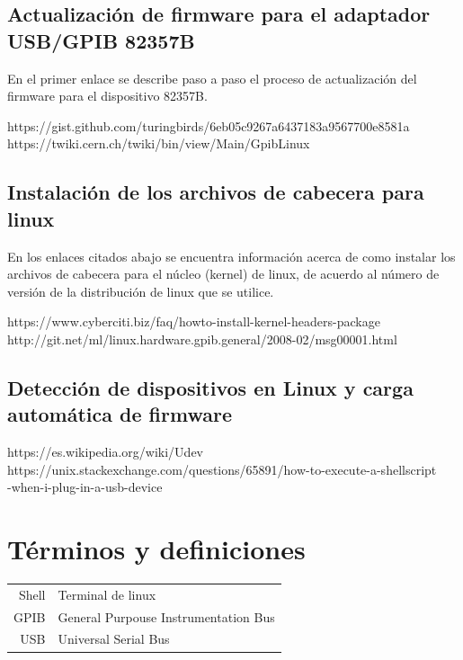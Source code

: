 \documentclass[paper=letter,oneside,fontsize=11pt, parskip=full]{scrartcl}
\newenvironment{link}
	{\ttfamily}{}
\begin{document}
	\subsection{Actualización de firmware para el adaptador USB/GPIB 82357B}
	
	En el primer enlace se describe paso a paso el proceso de actualización del firmware para el dispositivo 82357B.
	
	\begin{link}
		https://gist.github.com/turingbirds/6eb05c9267a6437183a9567700e8581a \\
		https://twiki.cern.ch/twiki/bin/view/Main/GpibLinux
	\end{link}
	
	\subsection{Instalación de los archivos de cabecera para linux}
	
	En los enlaces citados abajo se encuentra información acerca de como instalar los archivos de cabecera para el núcleo (kernel) de linux,  de acuerdo al número de versión de la distribución de linux que se utilice.
	
	\begin{link}
		https://www.cyberciti.biz/faq/howto-install-kernel-headers-package \\	
		http://git.net/ml/linux.hardware.gpib.general/2008-02/msg00001.html
	\end{link}

	\subsection{Detección de dispositivos en Linux y carga automática de firmware}
	
	\begin{link}
		https://es.wikipedia.org/wiki/Udev \\
		https://unix.stackexchange.com/questions/65891/how-to-execute-a-shellscript \\ 
		-when-i-plug-in-a-usb-device
	\end{link}
	
	\section{Términos y definiciones}
	
	\begin{tabular}{rl}
		Shell 	& 	Terminal de linux \\
		GPIB 	& 	General Purpouse Instrumentation Bus \\
		USB		&  	Universal Serial Bus \\
	\end{tabular}
	
\end{document}
